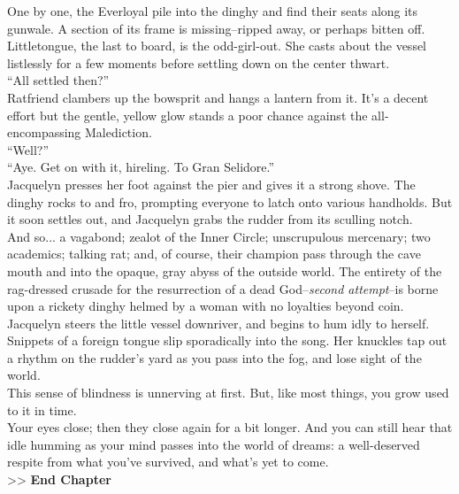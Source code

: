 One by one, the Everloyal pile into the dinghy and find their seats along its gunwale. A section of its frame is missing--ripped away, or perhaps bitten off. Littletongue, the last to board, is the odd-girl-out. She casts about the vessel listlessly for a few moments before settling down on the center thwart.\\

“All settled then?”\\

Ratfriend clambers up the bowsprit and hangs a lantern from it. It’s a decent effort but the gentle, yellow glow stands a poor chance against the all-encompassing Malediction.\\

“Well?”\\

“Aye. Get on with it, hireling. To Gran Selidore.”\\

Jacquelyn presses her foot against the pier and gives it a strong shove. The dinghy rocks to and fro, prompting everyone to latch onto various handholds. But it soon settles out, and Jacquelyn grabs the rudder from its sculling notch.\\

And so... a vagabond; zealot of the Inner Circle; unscrupulous mercenary; two academics; talking rat; and, of course, their champion pass through the cave mouth and into the opaque, gray abyss of the outside world. The entirety of the rag-dressed crusade for the resurrection of a dead God--\emph{second attempt}--is borne upon a rickety dinghy helmed by a woman with no loyalties beyond coin.\\

Jacquelyn steers the little vessel downriver, and begins to hum idly to herself. Snippets of a foreign tongue slip sporadically into the song. Her knuckles tap out a rhythm on the rudder’s yard as you pass into the fog, and lose sight of the world.\\

This sense of blindness is unnerving at first. But, like most things, you grow used to it in time.\\

Your eyes close; then they close again for a bit longer. And you can still hear that idle humming as your mind passes into the world of dreams: a well-deserved respite from what you’ve survived, and what’s yet to come.\\

>> \textbf{End Chapter}